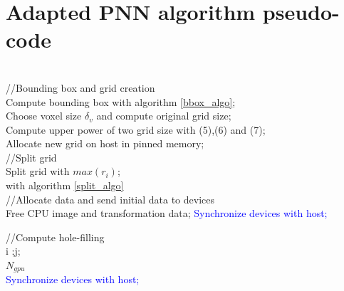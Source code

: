 \documentclass[12pt,journal,compsoc]{IEEEtran}
\begin{document}
\begin{minipage}{\textwidth}
\section{Adapted PNN algorithm pseudo-code}

\begin{algorithm}
\\

\textcolor{OliveGreen}{//Bounding box and grid creation}\\
Compute bounding box with algorithm \ref{bbox_algo};\\
Choose voxel size $\delta_v$ and compute original grid size;\\
Compute upper power of two grid size with (5),(6) and (7);\\
Allocate new grid on host in pinned memory;\\

\textcolor{OliveGreen}{//Split grid}\\
Split grid with $max(r_i)$;\\
with algorithm \ref{split_algo}\\

\textcolor{OliveGreen}{//Allocate data and send initial data to devices}\\
Free CPU image and transformation data;
\textcolor{Blue}{Synchronize devices with host;}

\textcolor{OliveGreen}{//Compute hole-filling}\\
i ;j;\\
$N_{gpu}$ \gets {}\\
\textcolor{Blue}{Synchronize devices with host;}\\
\end{algorithm}


\end{minipage}
\end{document}
